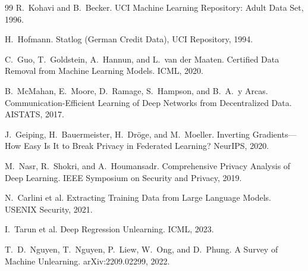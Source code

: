 \documentclass[sigconf,nonacm]{acmart}
\begin{document}
\begin{thebibliography}{99}
R.~Kohavi and B.~Becker.
\newblock UCI Machine Learning Repository: Adult Data Set, 1996.

H.~Hofmann.
\newblock Statlog (German Credit Data), UCI Repository, 1994.

C.~Guo, T.~Goldstein, A.~Hannun, and L.~van der Maaten.
\newblock Certified Data Removal from Machine Learning Models.
\newblock ICML, 2020.

B.~McMahan, E.~Moore, D.~Ramage, S.~Hampson, and B.~A.~y Arcas.
\newblock Communication-Efficient Learning of Deep Networks from Decentralized Data.
\newblock AISTATS, 2017.

J.~Geiping, H.~Bauermeister, H.~Dr{\"o}ge, and M.~Moeller.
\newblock Inverting Gradients---How Easy Is It to Break Privacy in Federated Learning?
\newblock NeurIPS, 2020.

M.~Nasr, R.~Shokri, and A.~Houmansadr.
\newblock Comprehensive Privacy Analysis of Deep Learning.
\newblock IEEE Symposium on Security and Privacy, 2019.

N.~Carlini et al.
\newblock Extracting Training Data from Large Language Models.
\newblock USENIX Security, 2021.

I.~Tarun et al.
\newblock Deep Regression Unlearning.
\newblock ICML, 2023.

T.~D.~Nguyen, T.~Nguyen, P.~Liew, W.~Ong, and D.~Phung.
\newblock A Survey of Machine Unlearning.
\newblock arXiv:2209.02299, 2022.

\end{thebibliography}
\end{document}
